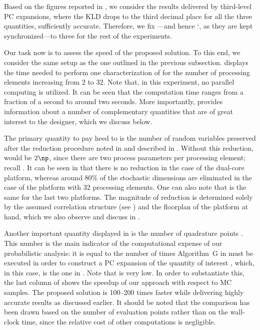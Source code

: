 Based on the figures reported in , we consider
the results delivered by third-level \ac{PC} expansions, where the \ac{KLD}
drops to the third decimal place for all the three quantities, sufficiently
accurate. Therefore, we fix \lc---and hence \lq, as they are kept
synchronized---to three for the rest of the experiments.


Our task now is to assess the speed of the proposed solution. To this end, we
consider the same setup as the one outlined in the previous subsection.
 displays the time needed to perform one
characterization of \vg for the number of processing elements \np increasing
from 2 to 32. Note that, in this experiment, no parallel computing is utilized.
It can be seen that the computation time ranges from a fraction of a second to
around two seconds. More importantly,  provides
information about a number of complementary quantities that are of great
interest to the designer, which we discuss below.

The primary quantity to pay heed to is the number of random variables \nz
preserved after the reduction procedure noted in  and
described in . Without this reduction, \nz
would be $2 \np$, since there are two process parameters per processing element;
recall . It can be seen in
 that there is no reduction in the case of the
dual-core platform, whereas around 80\% of the stochastic dimensions are
eliminated in the case of the platform with 32 processing elements. One can also
note that \nz is the same for the last two platforms. The magnitude of reduction
is determined solely by the assumed correlation structure (see
) and the floorplan of the platform at
hand, which we also observe and discuss in .

Another important quantity displayed in  is the
number of quadrature points \nq. This number is the main indicator of the
computational expense of our probabilistic analysis: it is equal to the number
of times Algorithm~G in  must be executed in order to
construct a \ac{PC} expansion of the quantity of interest \g, which, in this
case, is the one in . Note that \nq is very
low. In order to substantiate this, the last column of
 shows the speedup of our approach with respect
to  \ac{MC} samples. The proposed solution is 100--200 times faster
while delivering highly accurate results as discussed earlier. It should be
noted that the comparison has been drawn based on the number of evaluation
points rather than on the wall-clock time, since the relative cost of other
computations is negligible.

